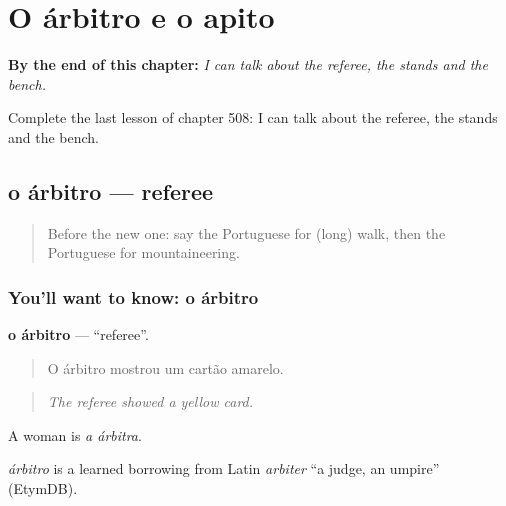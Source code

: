 
\chapter{O árbitro e o apito}
\label{ch:pt-o-arbitro-e-o-apito}

\begin{chapteropening}
\textbf{By the end of this chapter:} \emph{I can talk about the referee, the stands and the bench.}

Complete the last lesson of chapter 508: I can talk about the referee, the stands and the bench.
\end{chapteropening}

\section[o árbitro]{o árbitro — referee}

\label{lesson:PT-C508-arbitro}



\begin{quote}
Before the new one: say the Portuguese for (long) walk, then the Portuguese for mountaineering.
\end{quote}

\subsection*{You'll want to know: o árbitro}
\textbf{o árbitro} — \textquotedblleft{}referee\textquotedblright{}.

\begin{quote}
O árbitro mostrou um cartão amarelo.
\end{quote}

\begin{quote}
\emph{The referee showed a yellow card.}
\end{quote}

A woman is \emph{a árbitra}.

\begin{cousinweb}
\emph{árbitro} is a learned borrowing from Latin \emph{arbiter} \textquotedblleft{}a judge, an umpire\textquotedblright{} (EtymDB).
\end{cousinweb}

